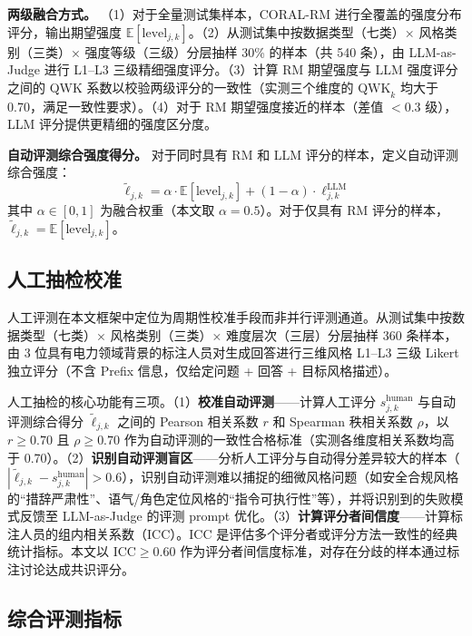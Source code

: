 \documentclass[fontset=fandol,type=master,campus=shenzhen,etitleauto=true]{hithesisbook}
\begin{document}
\textbf{两级融合方式。} （1）对于全量测试集样本，CORAL-RM 进行全覆盖的强度分布评分，输出期望强度 $\mathbb{E}[\text{level}_{j,k}]$。（2）从测试集中按数据类型（七类）× 风格类别（三类）× 强度等级（三级）分层抽样 30\% 的样本（共 540 条），由 LLM-as-Judge 进行 L1--L3 三级精细强度评分。（3）计算 RM 期望强度与 LLM 强度评分之间的 QWK 系数以校验两级评分的一致性（实测三个维度的 $\text{QWK}_k$ 均大于 0.70，满足一致性要求）。（4）对于 RM 期望强度接近的样本（差值 $< 0.3$ 级），LLM 评分提供更精细的强度区分度。

\textbf{自动评测综合强度得分。} 对于同时具有 RM 和 LLM 评分的样本，定义自动评测综合强度：
\begin{equation}
\tilde{\ell}_{j,k} = \alpha \cdot \mathbb{E}[\text{level}_{j,k}] + (1-\alpha) \cdot \ell_{j,k}^{\text{LLM}}
\end{equation}
其中 $\alpha \in [0,1]$ 为融合权重（本文取 $\alpha = 0.5$）。对于仅具有 RM 评分的样本，$\tilde{\ell}_{j,k} = \mathbb{E}[\text{level}_{j,k}]$。

\subsection{人工抽检校准}\label{ux4ebaux5de5ux62bdux68c0ux6821ux51c6}

人工评测在本文框架中定位为周期性校准手段而非并行评测通道。从测试集中按数据类型（七类）× 风格类别（三类）× 难度层次（三层）分层抽样 360 条样本，由 3 位具有电力领域背景的标注人员对生成回答进行三维风格 L1--L3 三级 Likert 独立评分（不含 Prefix 信息，仅给定问题 + 回答 + 目标风格描述）。

人工抽检的核心功能有三项。（1）\textbf{校准自动评测}------计算人工评分 $s_{j,k}^{\text{human}}$ 与自动评测综合得分 $\tilde{\ell}_{j,k}$ 之间的 Pearson 相关系数 $r$ 和 Spearman 秩相关系数 $\rho$，以 $r \geq 0.70$ 且 $\rho \geq 0.70$ 作为自动评测的一致性合格标准（实测各维度相关系数均高于 0.70）。（2）\textbf{识别自动评测盲区}------分析人工评分与自动得分差异较大的样本（$|\tilde{\ell}_{j,k} - s_{j,k}^{\text{human}}| > 0.6$），识别自动评测难以捕捉的细微风格问题（如安全合规风格的``措辞严肃性''、语气/角色定位风格的``指令可执行性''等），并将识别到的失败模式反馈至 LLM-as-Judge 的评测 prompt 优化。（3）\textbf{计算评分者间信度}------计算标注人员的组内相关系数（ICC）。ICC 是评估多个评分者或评分方法一致性的经典统计指标\cite{ref76}。本文以 $\text{ICC} \geq 0.60$ 作为评分者间信度标准，对存在分歧的样本通过标注讨论达成共识评分。

\subsection{综合评测指标}\label{ux7efcux5408ux8bc4ux6d4bux6307ux6807}
\end{document}
